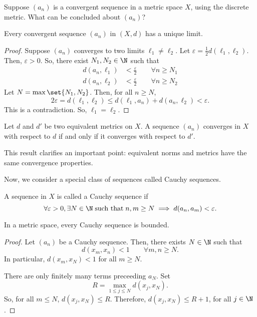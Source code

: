 \begin{nex}
  Suppose $(a_n)$ is a convergent sequence in a metric space $X$, using the discrete metric. What can be concluded about $(a_n)$?
\end{nex}

\begin{nlemma}
  Every convergent sequence $(a_n)$ in $(X,d)$ has a unique limit.
\end{nlemma}
\begin{proof}
  Suppose $(a_n)$ converges to two limits $\ell_1 \neq \ell_2$. Let $\varepsilon = \frac{1}{2} d(\ell_1,\ell_2)$. Then, $\varepsilon > 0$. So, there exist $N_1, N_2 \in \N$ such that
  \begin{align*}
    d(a_n, \ell_1) &< \frac{\varepsilon}{2} \qquad\forall n \geq N_1\\
    d(a_n, \ell_2) &< \frac{\varepsilon}{2} \qquad\forall n \geq N_2
  \end{align*}
  Let $N = \max\set{N_1, N_2}$. Then, for all $n \geq N$,
  \begin{equation*}
    2\varepsilon = d(\ell_1, \ell_2)
    \leq d(\ell_1, a_n) + d(a_n, \ell_2) < \varepsilon.
  \end{equation*}
  This is a contradiction. So, $\ell_1 = \ell_2$.
\end{proof}

\begin{nprop}
  Let $d$ and $d'$ be two equivalent metrics on $X$. A sequence $(a_n)$ converges in $X$ with respect to $d$ if and only if it converges with respect to $d'$.
\end{nprop}
This result clarifies an important point: equivalent norms and metrics have the same convergence properties.

Now, we consider a special class of sequences called Cauchy sequences.
\begin{ndfn}
  A sequence in $X$ is called a Cauchy sequence if
  \begin{equation*}
  \forall \varepsilon > 0, \exists N \in \N\;\text{such that}\;n,m \geq N \implies d(a_n, a_m) < \varepsilon.
  \end{equation*}
\end{ndfn}

\begin{nthm}
  In a metric space, every Cauchy sequence is bounded.
\end{nthm}
\begin{proof}
  Let $(a_n)$ be a Cauchy sequence. Then, there exists $N \in \N$ such that
  \begin{equation*}
    d(x_m, x_n) < 1 \qquad\forall m,n \geq N.
  \end{equation*}
  In particular, $d(x_m, x_N) < 1$ for all $m \geq N$.

  There are only finitely many terms preceeding $a_N$. Set
  \begin{equation*}
    R = \max_{1 \leq j \leq N} d(x_j, x_N).
  \end{equation*}
  So, for all $m \leq N$, $d(x_j, x_N) \leq R$. Therefore, $d(x_j, x_N) \leq R + 1$, for all $j \in \N$.
\end{proof}

